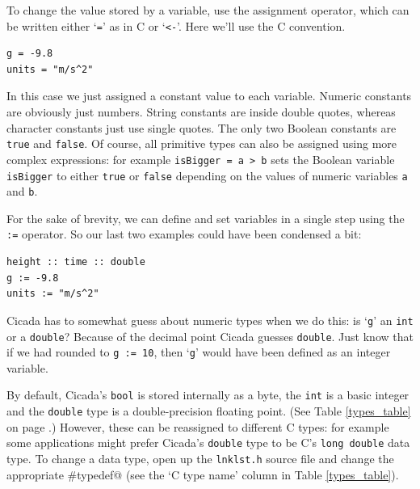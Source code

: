 \documentclass{article}
\newenvironment{code}{
       \begin{list}{}{
               \setlength{\leftmargin}{.4in}
               \setlength{\rightmargin}{0in}
               \setlength{\topsep}{.2in}
       }
       \small
       \item[] }
       { \end{list}   }
\begin{document}
To change the value stored by a variable, use the assignment operator, which can be written either `\verb#=#' as in C or `\verb#<-#'.  Here we'll use the C convention.

\begin{code} \begin{verbatim}
g = -9.8
units = "m/s^2"
\end{verbatim} \end{code}

\noindent In this case we just assigned a constant value to each variable.  Numeric constants are obviously just numbers.  String constants are inside double quotes, whereas character constants just use single quotes.  The only two Boolean constants are \verb#true# and \verb#false#.  Of course, all primitive types can also be assigned using more complex expressions:  for example \verb#isBigger = a > b# sets the Boolean variable \verb#isBigger# to either \verb#true# or \verb#false# depending on the values of numeric variables \verb#a# and \verb#b#.

For the sake of brevity, we can define and set variables in a single step using the \verb#:=# operator.  So our last two examples could have been condensed a bit:

\begin{code} \begin{verbatim}
height :: time :: double
g := -9.8
units := "m/s^2"
\end{verbatim} \end{code}

\noindent Cicada has to somewhat guess about numeric types when we do this:  is `\verb#g#' an \verb#int# or a \verb#double#?  Because of the decimal point Cicada guesses \verb#double#.  Just know that if we had rounded to \verb#g := 10#, then `\verb#g#' would have been defined as an integer variable.

By default, Cicada's \verb#bool# is stored internally as a byte, the \verb#int# is a basic integer and the \verb#double# type is a double-precision floating point.  (See Table \ref{types_table} on page \pageref{types_table}.)  However, these can be reassigned to different C types:  for example some applications might prefer Cicada's \verb#double# type to be C's \verb#long double# data type.  To change a data type, open up the \verb#lnklst.h# source file and change the appropriate \verb@#typedef@ (see the `C type name' column in Table \ref{types_table}).
\end{document}
